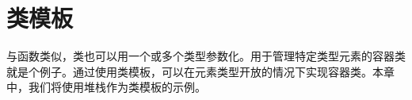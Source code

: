
\chapter{类模板}

与函数类似，类也可以用一个或多个类型参数化。用于管理特定类型元素的容器类就是个例子。通过使用类模板，可以在元素类型开放的情况下实现容器类。本章中，我们将使用堆栈作为类模板的示例。











